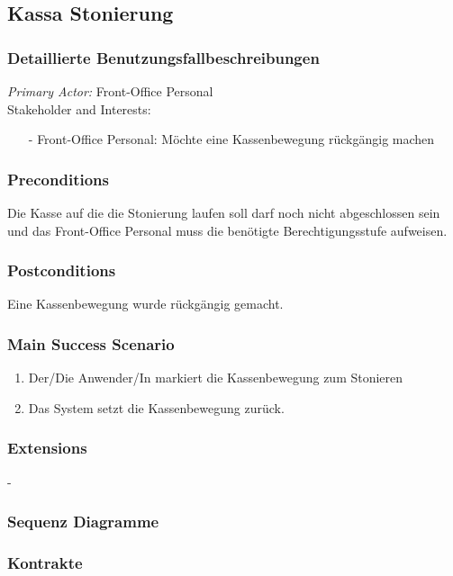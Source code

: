 \documentclass[./detailed_overview_usecases.tex]{subfiles}
\begin{document}
    \subsection{Kassa Stonierung}
    \subsubsection{Detaillierte Benutzungsfallbeschreibungen}
    \textit{Primary Actor:}
    Front-Office Personal
    \\
    Stakeholder and Interests:
    \begin{itemize}
        \item[-] Front-Office Personal: Möchte eine Kassenbewegung rückgängig machen
    \end{itemize}

    \subsubsection*{Preconditions}
    Die Kasse auf die die Stonierung laufen soll darf noch nicht abgeschlossen sein und das
    Front-Office Personal muss die benötigte Berechtigungsstufe aufweisen.

    \subsubsection*{Postconditions}
    Eine Kassenbewegung wurde rückgängig gemacht.

    \subsubsection*{Main Success Scenario}
    \begin{enumerate}
        \item Der/Die Anwender/In markiert die Kassenbewegung zum Stonieren
        \item Das System setzt die Kassenbewegung zurück.
    \end{enumerate}

    \subsubsection*{Extensions}
    -

    \subsubsection{Sequenz Diagramme}
    \subsubsection{Kontrakte}
\end{document}
